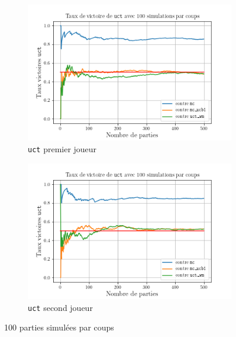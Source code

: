 \documentclass[a4paper]{article}
\theoremstyle{definition}
\begin{document}
\begin{figure}[!h]
	\centering
	\begin{subfigure}{0.49\textwidth}
		\centering
		\includegraphics[width=\textwidth]{n100_uct_snd.png}
		\caption{\texttt{uct} premier joueur}
		\label{fig:n100-uct-snd}
	\end{subfigure}
	\hfill
	\begin{subfigure}{0.49\textwidth}
		\centering
		\includegraphics[width=\textwidth]{n100_uct_first.png}
		\caption{\texttt{uct} second joueur}
		\label{fig:n100-uct-first}
	\end{subfigure}
	\caption{100 parties simulées par coups}
	\label{fig:n100}
\end{figure}
\end{document}
